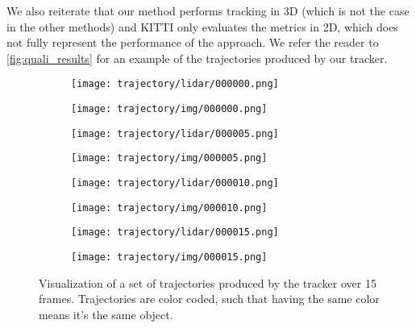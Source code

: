 \documentclass[letterpaper, 10 pt, conference]{ieeeconf}  \pdfminorversion=4
\begin{document}
We also reiterate that our method performs tracking in 3D (which is not the case in the other  methods) and KITTI only evaluates the metrics in 2D, which does not fully represent the performance of the approach. We refer the reader to \autoref{fig:quali_results} for an example of the trajectories produced by our tracker.

\begin{figure*}[!htb]
\centering
  \begin{subfigure}[b]{0.33\textwidth}
    \texttt{[image: trajectory/lidar/000000.png]}
  \end{subfigure}
  \begin{subfigure}[b]{0.56\textwidth}
    \texttt{[image: trajectory/img/000000.png]}
  \end{subfigure}
  \begin{subfigure}[b]{0.33\textwidth}
    \texttt{[image: trajectory/lidar/000005.png]}
  \end{subfigure}
  \begin{subfigure}[b]{0.56\textwidth}
    \texttt{[image: trajectory/img/000005.png]}
  \end{subfigure}
  \begin{subfigure}[b]{0.33\textwidth}
    \texttt{[image: trajectory/lidar/000010.png]}
  \end{subfigure}
  \begin{subfigure}[b]{0.56\textwidth}
    \texttt{[image: trajectory/img/000010.png]}
  \end{subfigure}
  \begin{subfigure}[b]{0.33\textwidth}
    \texttt{[image: trajectory/lidar/000015.png]}
  \end{subfigure}
  \begin{subfigure}[b]{0.56\textwidth}
    \texttt{[image: trajectory/img/000015.png]}
  \end{subfigure}
  \caption{Visualization of a set of trajectories produced by the tracker over 15 frames. Trajectories are color coded, such that having the same color means it's the same object.}
  \label{fig:quali_results}
\end{figure*}
\end{document}
